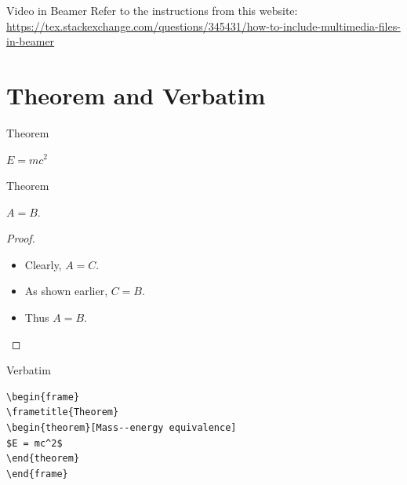 \documentclass{beamer}
\begin{document}
\begin{frame}{Video in Beamer}
Refer to the instructions from this website:\\

\url{https://tex.stackexchange.com/questions/345431/how-to-include-multimedia-files-in-beamer}

\end{frame}

\section{Theorem and Verbatim}

\begin{frame}{Theorem}
\begin{theorem}
$E = mc^2$
\end{theorem}
\end{frame}

\begin{frame}[<+->]{Theorem}
  \begin{theorem}
    $A = B$.
  \end{theorem}
  \begin{proof}
    \begin{itemize}
    \item Clearly, $A = C$.
    \item As shown earlier,  $C = B$.
    \item<-3>Thus $A = B$.
    \end{itemize}
  \end{proof}
\end{frame}


\begin{frame}[fragile] %
{Verbatim}
\begin{example}
\begin{verbatim}
\begin{frame}
\frametitle{Theorem}
\begin{theorem}[Mass--energy equivalence]
$E = mc^2$
\end{theorem}
\end{frame}\end{verbatim}
\end{example}


\end{frame}
\end{document}
